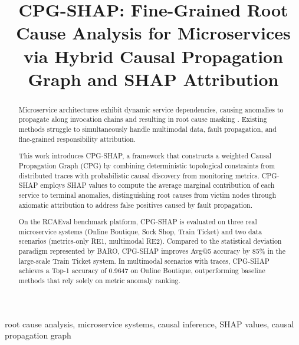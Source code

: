 \documentclass[conference]{IEEEtran}
\begin{document}
\title{CPG-SHAP: Fine-Grained Root Cause Analysis for Microservices via Hybrid Causal Propagation Graph and SHAP Attribution}


\maketitle

\begin{abstract}
Microservice architectures exhibit dynamic service dependencies, causing anomalies to propagate along invocation chains and resulting in root cause masking \cite{dynacausal}. Existing methods struggle to simultaneously handle multimodal data, fault propagation, and fine-grained responsibility attribution.

This work introduces CPG-SHAP, a framework that constructs a weighted Causal Propagation Graph (CPG) by combining deterministic topological constraints from distributed traces with probabilistic causal discovery from monitoring metrics. CPG-SHAP employs SHAP values to compute the average marginal contribution of each service to terminal anomalies, distinguishing root causes from victim nodes through axiomatic attribution to address false positives caused by fault propagation.

On the RCAEval benchmark platform, CPG-SHAP is evaluated on three real microservice systems (Online Boutique, Sock Shop, Train Ticket) and two data scenarios (metrics-only RE1, multimodal RE2). Compared to the statistical deviation paradigm represented by BARO, CPG-SHAP improves Avg@5 accuracy by 85\% in the large-scale Train Ticket system. In multimodal scenarios with traces, CPG-SHAP achieves a Top-1 accuracy of 0.9647 on Online Boutique, outperforming baseline methods that rely solely on metric anomaly ranking.
\end{abstract}

\begin{IEEEkeywords}
root cause analysis, microservice systems, causal inference, SHAP values, causal propagation graph
\end{IEEEkeywords}
\end{document}
